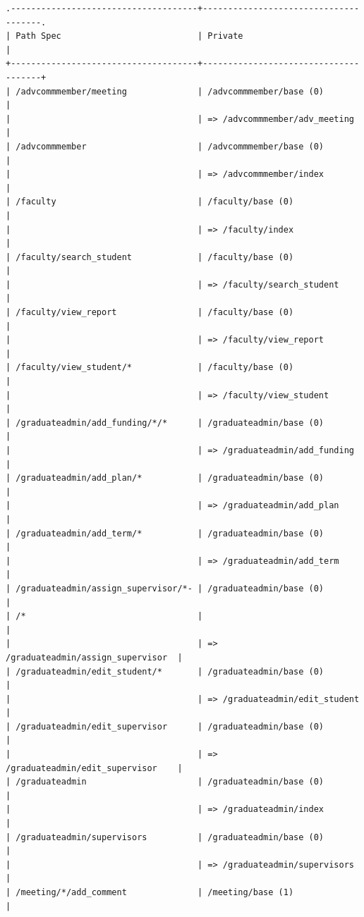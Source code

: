 \documentclass{journal}
\begin{document}
\begin{verbatim}
.-------------------------------------+--------------------------------------.
| Path Spec                           | Private                              |
+-------------------------------------+--------------------------------------+
| /advcommmember/meeting              | /advcommmember/base (0)              |
|                                     | => /advcommmember/adv_meeting        |
| /advcommmember                      | /advcommmember/base (0)              |
|                                     | => /advcommmember/index              |
| /faculty                            | /faculty/base (0)                    |
|                                     | => /faculty/index                    |
| /faculty/search_student             | /faculty/base (0)                    |
|                                     | => /faculty/search_student           |
| /faculty/view_report                | /faculty/base (0)                    |
|                                     | => /faculty/view_report              |
| /faculty/view_student/*             | /faculty/base (0)                    |
|                                     | => /faculty/view_student             |
| /graduateadmin/add_funding/*/*      | /graduateadmin/base (0)              |
|                                     | => /graduateadmin/add_funding        |
| /graduateadmin/add_plan/*           | /graduateadmin/base (0)              |
|                                     | => /graduateadmin/add_plan           |
| /graduateadmin/add_term/*           | /graduateadmin/base (0)              |
|                                     | => /graduateadmin/add_term           |
| /graduateadmin/assign_supervisor/*- | /graduateadmin/base (0)              |
| /*                                  |                                      |
|                                     | => /graduateadmin/assign_supervisor  |
| /graduateadmin/edit_student/*       | /graduateadmin/base (0)              |
|                                     | => /graduateadmin/edit_student       |
| /graduateadmin/edit_supervisor      | /graduateadmin/base (0)              |
|                                     | => /graduateadmin/edit_supervisor    |
| /graduateadmin                      | /graduateadmin/base (0)              |
|                                     | => /graduateadmin/index              |
| /graduateadmin/supervisors          | /graduateadmin/base (0)              |
|                                     | => /graduateadmin/supervisors        |
| /meeting/*/add_comment              | /meeting/base (1)                    |

\end{verbatim}
\end{document}
